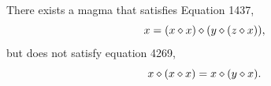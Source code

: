 %
%
%



\begin{theorem}[1437 example]\label{1437-thm}  There exists a magma that satisfies Equation 1437,
  $$ x = (x \diamond x) \diamond (y \diamond (z \diamond x)),$$
but does not satisfy equation 4269,
$$ x \diamond (x \diamond x) = x \diamond (y \diamond x).$$
\end{theorem}

